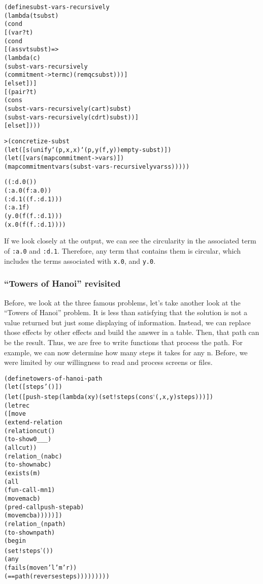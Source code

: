 \begin{alltt}
(define subst-vars-recursively
  (lambda (t subst)
    (cond
      [(var? t)
       (cond
         [(assv t subst) =>
          (lambda (c)
            (subst-vars-recursively
              (commitment->term c) (remq c subst)))]
         [else t])]
      [(pair? t)
       (cons
         (subst-vars-recursively (car t) subst)
         (subst-vars-recursively (cdr t) subst))]
      [else t])))

> (concretize-subst
    (let ([s (unify `(p ,x ,x) `(p ,y (f ,y)) empty-subst)])
      (let ([vars (map commitment->var s)])
        (map commitment vars (subst-vars-recursively vars s)))))

((:d.0 ())
 (:a.0 (f :a.0))
 (:d.1 ((f . :d.1)))
 (:a.1 f)
 (y.0 (f (f . :d.1)))
 (x.0 (f (f . :d.1))))
\end{alltt}

If we look closely at the output, we can see the circularity in the
associated term of \texttt{:a.0} and \texttt{:d.1}.  Therefore, any
term that contains them is circular, which includes the terms
associated with \texttt{x.0}, and \texttt{y.0}.

\subsubsection{``Towers of Hanoi'' revisited}

Before, we look at the three famous problems, let's take another look at
the ``Towers of Hanoi'' problem.  It is less than satisfying that the
solution is not a value returned but just some displaying of information.
Instead, we can replace those effects by other effects and build
the answer in a table.  Then, that path can be the result.  Thus, we are
free to write functions that process the path.  For example, we can now
determine how many steps it takes for any n.  Before, we were limited by
our willingness to read and process screens or files.
\newpage
\begin{alltt}
(define towers-of-hanoi-path
  (let ([steps '()])
    (let ([push-step (lambda (x y) (set! steps (cons `(,x ,y) steps)))])
      (letrec
        ([move
           (extend-relation
             (relation cut ()
               (to-show 0 _ _ _)
               (all cut))
             (relation _ (n a b c)
               (to-show n a b c)
               (exists (m)
                 (all
                   (fun-call - m n 1)
                   (move m a c b)
                   (pred-call push-step a b)
                   (move m c b a)))))])
        (relation _ (n path)
          (to-show n path)
          (begin
            (set! steps '())
            (any
              (fails (move n 'l 'm 'r))
              (== path (reverse steps)))))))))
\end{alltt}

